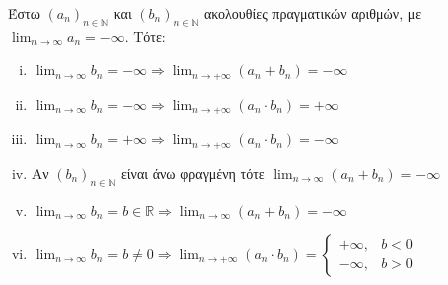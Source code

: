 \documentclass[a4paper,table]{report}
\begin{document}
\begin{mybox3}
  \begin{prop}
    Έστω $ {(a_{n})}_{n \in \mathbb{N}} $ και $ {(b_{n})}_{n \in \mathbb{N}} $ ακολουθίες 
    πραγματικών αριθμών, με $ \lim_{n \to \infty} a_{n}= -\infty $. Τότε:
    \begin{enumerate}[i)]
      \item $ \lim_{n \to \infty} b_{n} = -\infty \Rightarrow \lim_{n \to +\infty}
        (a_{n}+b_{n})= -\infty$
      \item $ \lim_{n \to \infty} b_{n} = -\infty \Rightarrow \lim_{n \to +\infty}
        (a_{n}\cdot b_{n})= +\infty$
      \item $ \lim_{n \to \infty} b_{n} = +\infty \Rightarrow \lim_{n \to +\infty}
        (a_{n}\cdot b_{n})= -\infty$
      \item Αν $ {(b_{n})}_{n \in \mathbb{N}} $ είναι άνω φραγμένη τότε $ \lim_{n \to
        \infty} (a_{n}+b_{n}) = -\infty $
      \item $ \lim_{n \to \infty} b_{n} = b \in \mathbb{R} 
        \Rightarrow \lim_{n \to \infty} (a_{n}+b_{n})= -\infty$
      \item $ \lim_{n \to \infty} b_{n} = b \neq 0 
        \Rightarrow \lim_{n \to +\infty} (a_{n}\cdot b_{n})= 
        \begin{cases} 
          +\infty, & b <0 \\
          -\infty, & b >0 
        \end{cases} $
    \end{enumerate}
  \end{prop}
\end{mybox3}
\end{document}
